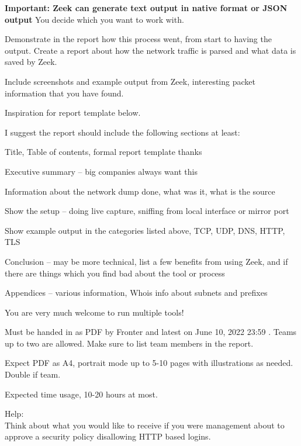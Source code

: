 \documentclass[a4paper,11pt,notitlepage]{report}
\begin{document}
{\bf Important: Zeek can generate text output in native format or JSON output} You decide which you want to work with.

Demonstrate in the report how this process went, from start to having the output.
Create a report about how the network traffic is parsed and what data is saved by Zeek.

Include screenshots and example output from Zeek, interesting packet information that you have found.

Inspiration for report template below.

I suggest the report should include the following sections at least:
\begin{list2}
\item Title, Table of contents, formal report template thanks
\item Executive summary -- big companies always want this
\item Information about the network dump done, what was it, what is the source
\item Show the setup -- doing live capture, sniffing from local interface or mirror port
\item Show example output in the categories listed above, TCP, UDP, DNS, HTTP, TLS
\item Conclusion -- may be more technical, list a few benefits from using Zeek, and if there are things which you find bad about the tool or process
\item Appendices -- various information, Whois info about subnets and prefixes
\end{list2}

You are very much welcome to run multiple tools!

Must be handed in as PDF by Fronter and latest on June 10, 2022 23:59 . Teams up to two are allowed. Make sure to list team members in the report.

Expect PDF as A4, portrait mode up to 5-10 pages with illustrations as needed. Double if team.

Expected time usage, 10-20 hours at most.

Help:\\
Think about what you would like to receive if you were management about to approve a security policy disallowing HTTP based logins.
\end{document}
